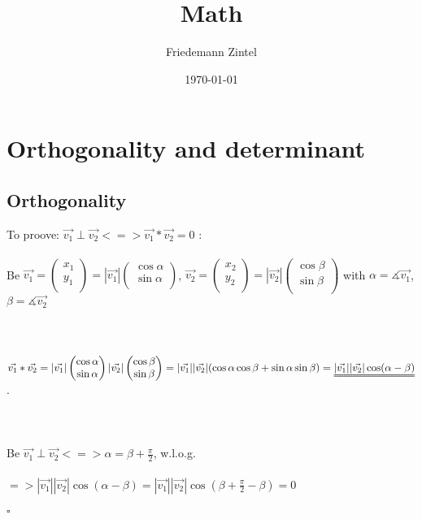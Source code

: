 \documentclass[a4paper]{article}
\title{Math}
\author{Friedemann Zintel}
\date{\today}
\newcommand*{\vecdd}[2]{\begin{pmatrix}#1\\#2\\\end{pmatrix}}
\begin{document}
\tableofcontents
\newpage
\section{Orthogonality and determinant}
\subsection*{Orthogonality}
To proove: $\vec{v_1}\perp \vec{v_2} <=> \vec{v_1}*\vec{v_2}=0$ :\\\\
Be $\vec{v_1}=\vecdd{x_1}{y_1}=|\vec{v_1}|\vecdd{\cos\alpha}{\sin\alpha}$, $\vec{v_2}=\vecdd{x_2}{y_2}=|\vec{v_2}|\vecdd{\cos\beta}{\sin\beta}$
with $\alpha=\measuredangle\vec{v_1}$, $\beta=\measuredangle\vec{v_2}$
\\\\\\\\
$\vec{v_1}*\vec{v_2}
=|\vec{v_1}|\vecdd{\cos\alpha}{\sin\alpha}|\vec{v_2}|\vecdd{\cos\beta}{\sin\beta}
=|\vec{v_1}||\vec{v_2}|(\cos\alpha\cos\beta+\sin\alpha\sin\beta)=\uuline{|\vec{v_1}||\vec{v_2}|\cos(\alpha-\beta)}$.
\\\\\\\\
Be $\vec{v_1}\perp \vec{v_2} <=> \alpha=\beta+\frac{\pi}{2}$, w.l.o.g.
\\\\
$=>|\vec{v_1}||\vec{v_2}|\cos(\alpha-\beta)=|\vec{v_1}||\vec{v_2}|\cos(\beta+\frac{\pi}{2}-\beta)=0$
\\\\$\square$
\end{document}
